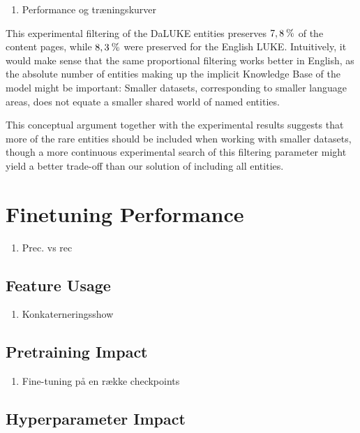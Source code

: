 \documentclass[main.tex]{subfiles}
\begin{document}
\begin{enumerate}
    \item Performance og træningskurver
\end{enumerate}

This experimental filtering of the DaLUKE entities preserves $7,8\:\text{\%{}}$ of the content pages, while $8,3\:\text{\%{}}$ were preserved for the English LUKE.
Intuitively, it would make sense that the same proportional filtering works better in English, as the absolute number of entities making up the implicit Knowledge Base of the model might be important:
Smaller datasets, corresponding to smaller language areas, does not equate a smaller shared world of named entities.

This conceptual argument together with the experimental results suggests that more of the rare entities should be included when working with smaller datasets, though a more continuous experimental search of this filtering parameter might yield a better trade-off than our solution of including all entities.

\section{Finetuning Performance}
\begin{enumerate}
    \item Prec. vs rec
\end{enumerate}

\subsection{Feature Usage}%
\label{sub:Feature Usage}

\begin{enumerate}
    \item Konkaterneringsshow
\end{enumerate}


\subsection{Pretraining Impact}
\begin{enumerate}
    \item Fine-tuning på en række checkpoints
\end{enumerate}

\subsection{Hyperparameter Impact}
\end{document}
